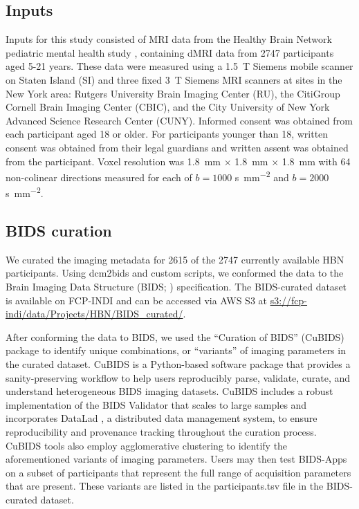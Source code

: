 \documentclass[fleqn,10pt,inline]{wlscirep}
\begin{document}
\subsection*{Inputs}

Inputs for this study consisted of MRI data from the Healthy Brain Network
pediatric mental health study \cite{alexander2017-yc}, containing dMRI data from
\num{2747} participants aged 5-21 years.
These data were measured using a \qty{1.5}{\tesla} Siemens mobile scanner on Staten Island (SI) and three fixed
\qty{3}{\tesla} Siemens MRI scanners at sites in the New York area: Rutgers
University Brain Imaging Center (RU), the CitiGroup Cornell Brain Imaging
Center (CBIC), and the City University of New York Advanced Science Research
Center (CUNY).
Informed consent was obtained from each participant aged 18 or
older. For participants younger than 18, written consent was obtained from their
legal guardians and written assent was obtained from the participant. Voxel
resolution was \qty{1.8}{\mm} $\times$ \qty{1.8}{\mm} $\times$ \qty{1.8}{\mm} with \num{64} non-colinear
directions measured for each of $b=1000$ \unit{\second \per \mm^{2}} and
$b=2000$ \unit{\second \per \mm^{2}}.

\subsection*{BIDS curation}

We curated the imaging metadata for \num{2615} of the \num{2747} currently
available HBN participants. Using dcm2bids and custom scripts, we conformed the data
to the Brain Imaging Data Structure (BIDS; \cite{gorgolewski2016-lh})
specification. The BIDS-curated dataset is available on FCP-INDI and can be
accessed via AWS S3 at \url{s3://fcp-indi/data/Projects/HBN/BIDS_curated/}.

After conforming the data to BIDS, we used the ``Curation of BIDS'' (CuBIDS) package \cite{sydney-covitz2022-cubids} to identify unique combinations, or ``variants'' of imaging parameters in the curated dataset.
CuBIDS is a Python-based software package that provides a sanity-preserving workflow to help users reproducibly parse, validate, curate, and understand heterogeneous BIDS imaging datasets. CuBIDS includes a robust implementation of the BIDS Validator that scales to large samples and incorporates DataLad \cite{halchenko2021datalad}, a distributed data management system, to ensure reproducibility and provenance tracking throughout the curation process. CuBIDS tools also employ agglomerative clustering to identify the aforementioned variants of imaging parameters. Users may then test BIDS-Apps on a subset of participants that represent the full range of acquisition parameters that are present. These variants are listed in the participants.tsv file in the BIDS-curated dataset.
\end{document}
